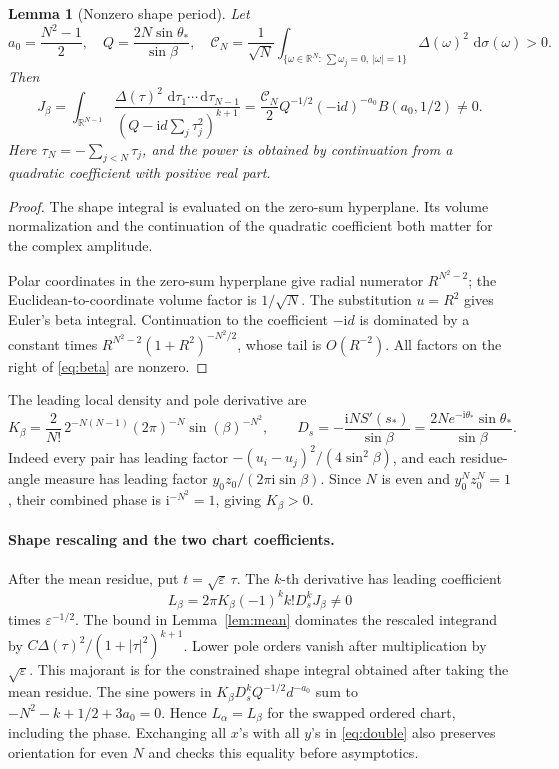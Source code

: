 \documentclass[11pt]{article}
\numberwithin{equation}{section}
\newtheorem{lemma}[theorem]{Lemma}
\theoremstyle{definition}
\newcommand{\dd}{\,\mathrm d}
\newcommand{\ii}{\mathrm i}
\newcommand{\R}{\mathbb R}
\newcommand{\eps}{\varepsilon}
\newcommand{\sstar}{s_*}
\begin{document}
\begin{lemma}[Nonzero shape period]\label{lem:period}
Let
\[
 a_0=\frac{N^2-1}{2},\quad Q=\frac{2N\sin\theta_*}{\sin\beta},\quad
 \mathscr C_N=\frac1{\sqrt N}
 \int_{\{\omega\in\R^N:\,\sum\omega_j=0,\ |\omega|=1\}}
       \Delta(\omega)^2\,\dd\sigma(\omega)>0 .
\]
Then
\begin{equation}
 J_\beta=\int_{\R^{N-1}}\frac{\Delta(\tau)^2\,
                  \dd\tau_1\cdots\dd\tau_{N-1}}
                   {(Q-\ii d\sum_j\tau_j^2)^{k+1}}
 =\frac{\mathscr C_N}{2}Q^{-1/2}(-\ii d)^{-a_0}
                     B(a_0,1/2)\ne0. \label{eq:beta}
\end{equation}
Here \(\tau_N=-\sum_{j<N}\tau_j\), and the power is obtained by
continuation from a quadratic coefficient with positive real part.
\end{lemma}
\begin{proof}
The shape integral is evaluated on the zero-sum hyperplane. Its volume normalization and the continuation of the quadratic coefficient both matter for the complex amplitude.

Polar coordinates in the zero-sum hyperplane give radial numerator
\(R^{N^2-2}\); the Euclidean-to-coordinate volume factor is \(1/\sqrt N\).
The substitution \(u=R^2\) gives Euler's beta integral.
Continuation to the coefficient \(-\ii d\) is dominated by a constant
times \(R^{N^2-2}(1+R^2)^{-N^2/2}\), whose tail is \(O(R^{-2})\).
All factors on the right of \eqref{eq:beta} are nonzero.
\end{proof}

The leading local density and pole derivative are
\[
 K_\beta=\frac2{N!}\,2^{-N(N-1)}(2\pi)^{-N}\sin(\beta)^{-N^2},
 \qquad
 D_s=-\frac{\ii N S'(\sstar)}{\sin\beta}
     =\frac{2N e^{-\ii\theta_*}\sin\theta_*}{\sin\beta}.
\]
Indeed every pair has leading factor
\(- (u_i-u_j)^2/(4\sin^2\beta)\), and each residue-angle measure
has leading factor \(y_0z_0/(2\pi\ii\sin\beta)\).
Since \(N\) is even and \(y_0^Nz_0^N=1\), their combined phase is
\(\ii^{-N^2}=1\), giving \(K_\beta>0\).

\paragraph{Shape rescaling and the two chart coefficients.}
After the mean residue, put \(t=\sqrt\eps\,\tau\).
The \(k\)-th derivative has leading coefficient
\[
 L_\beta=2\pi K_\beta(-1)^k k!D_s^kJ_\beta\ne0
\]
times \(\eps^{-1/2}\). The bound in Lemma~\ref{lem:mean} dominates
the rescaled integrand by
\(C\Delta(\tau)^2/(1+|\tau|^2)^{k+1}\).
Lower pole orders vanish after multiplication by \(\sqrt\eps\).
This majorant is for the constrained shape integral obtained after
taking the mean residue.
The sine powers in \(K_\beta D_s^kQ^{-1/2}d^{-a_0}\) sum to
\(-N^2-k+1/2+3a_0=0\). Hence \(L_\alpha=L_\beta\)
for the swapped ordered chart, including the phase. Exchanging all
\(x\)'s with all \(y\)'s in \eqref{eq:double} also preserves orientation
for even \(N\) and checks this equality before asymptotics.
\end{document}
